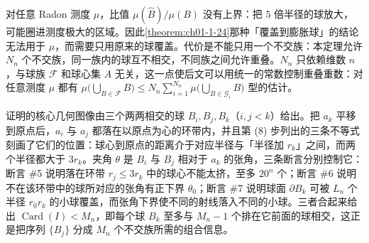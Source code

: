 \documentclass[../../main.tex]{subfiles}%
\begin{document}
\begin{remark}\label{remark:ch01-thm-1-27-动机}
对任意 Radon 测度 $\mu$，比值 $\mu(\hat B)/\mu(B)$ 没有上界：把 $5$ 倍半径的球放大，可能圈进测度极大的区域。因此\cref{theorem:ch01-1-24}那种「覆盖到膨胀球」的结论无法用于 $\mu$，而需要只用原来的球覆盖。代价是不能只用一个不交族：本定理允许 $N_n$ 个不交族，同一族内的球互不相交，不同族之间允许重叠。$N_n$ 只依赖维数 $n$，与球族 $\mathcal{F}$ 和球心集 $A$ 无关，这一点使后文可以用统一的常数控制重叠重数：对任意测度 $\mu$ 都有 $\mu\bigl(\bigcup_{B\in\mathcal{F}}B\bigr)\leqslant N_n\sum_{i=1}^{N_n}\mu\bigl(\bigcup_{B\in\mathcal{G}_i}B\bigr)$ 型的估计。%
\end{remark}

\begin{remark}\label{remark:ch01-thm-1-27-几何}
证明的核心几何图像由三个两两相交的球 $B_i,B_j,B_k$（$i,j<k$）给出。把 $a_k$ 平移到原点后，$a_i$ 与 $a_j$ 都落在以原点为心的环带内，并且第 (8) 步列出的三条不等式刻画了它们的位置：球心到原点的距离介于对应半径与「半径加 $r_k$」之间，而两个半径都大于 $3r_k$。夹角 $\theta$ 是 $B_i$ 与 $B_j$ 相对于 $a_k$ 的张角，三条断言分别控制它：断言 \#5 说明落在环带 $r_j\leqslant3r_k$ 中的球心不能太挤，至多 $20^n$ 个；断言 \#6 说明不在该环带中的球所对应的张角有正下界 $\theta_0$；断言 \#7 说明球面 $\partial B_k$ 可被 $L_n$ 个半径 $r_0r_k$ 的小球覆盖，而张角下界使不同的射线落入不同的小球。三者合起来给出 $\operatorname{Card}(I)<M_n$，即每个球 $B_k$ 至多与 $M_n-1$ 个排在它前面的球相交，这正是把序列 $\{B_j\}$ 分成 $M_n$ 个不交族所需的组合信息。
\end{remark}
\end{document}
